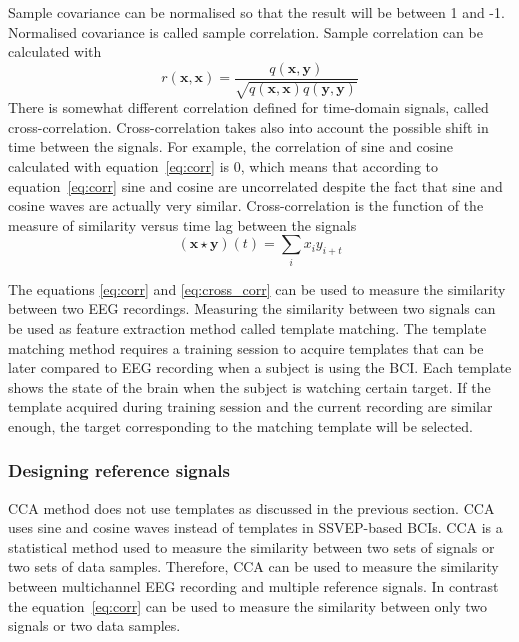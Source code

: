 Sample covariance can be normalised so that the result will be between 1 and -1. Normalised covariance is called sample correlation. Sample correlation can be calculated with
\begin{equation}
	\label{eq:corr}
	r(\mathbf{x},\mathbf{x}) = \frac{q(\mathbf{x},\mathbf{y})}{\sqrt{q(\mathbf{x},\mathbf{x})q(\mathbf{y},\mathbf{y})}}
\end{equation}
There is somewhat different correlation defined for time-domain signals, called cross-correlation. Cross-correlation takes also into account the possible shift in time between the signals. For example, the correlation of sine and cosine calculated with equation~\ref{eq:corr} is 0, which means that according to equation~\ref{eq:corr} sine and cosine are uncorrelated despite the fact that sine and cosine waves are actually very similar. Cross-correlation is the function of the measure of similarity versus time lag between the signals
\begin{equation}
	\label{eq:cross_corr}
	(\mathbf{x}\star \mathbf{y})(t)=\sum_{i}x_iy_{i+t}
\end{equation}

The equations \ref{eq:corr} and \ref{eq:cross_corr} can be used to measure the similarity between two \gls{EEG} recordings. Measuring the similarity between two signals can be used as \gls{feature extraction} method called template matching. The template matching method requires a training session to acquire templates that can be later compared to \gls{EEG} recording when a subject is using the \gls{BCI}. Each template shows the state of the brain when the subject is watching certain \gls{target}. If the template acquired during training session and the current recording are similar enough, the target corresponding to the matching template will be selected.

\subsubsection{Designing reference signals}

\gls{CCA} method does not use templates as discussed in the previous section. \gls{CCA} uses sine and cosine waves instead of templates in \gls{SSVEP}-based \glspl{BCI}. \gls{CCA} is a statistical method used to measure the similarity between two sets of signals or two sets of data samples. Therefore, \gls{CCA} can be used to measure the similarity between multichannel \gls{EEG} recording and multiple reference signals. In contrast the equation~\ref{eq:corr} can be used to measure the similarity between only two signals or two data samples.

